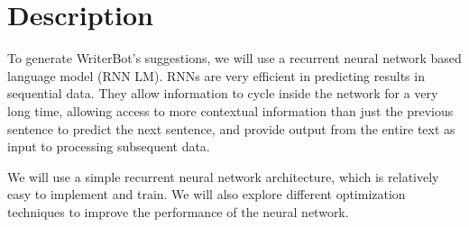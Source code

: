 \section{Description}\label{sec:description}
To generate WriterBot’s suggestions, we will use a recurrent neural network based
language model (RNN LM). RNNs are very efficient in predicting results in sequential
data. They allow information to cycle inside the network for a very long time,
allowing access to more contextual information than just the previous sentence
to predict the next sentence, and provide output from the entire text as input to
processing subsequent data.

We will use a simple recurrent neural network architecture\cite{RNN_language_model},
which is relatively easy to implement and train. We will also explore different
optimization techniques to improve the performance of the neural network.
